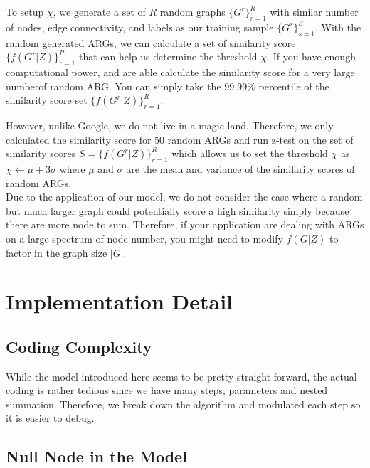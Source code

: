 To setup $\chi$, we generate a set of $R$ random graphs $\{G^r\}^{R}_{r=1}$ with similar number of nodes, edge connectivity\footnotemark, and labels as our training sample $\{G^s\}^{S}_{s=1}$. With the random generated ARGs, we can calculate a set of similarity score $\{f(G^r|Z)\}^{R}_{r=1}$ that can help us determine the threshold $\chi$. If you have enough computational power, and are able calculate the similarity score for a very large number\footnotemark of random ARG. You can simply take the $99.99\%$ percentile of the similarity score set $\{f(G^r|Z)\}^{R}_{r=1}$.\\

However, unlike Google\footnotemark, we do not live in a magic land. Therefore, we only calculated the similarity score for $50$ random ARGs and run z-test on the set of similarity scores $S=\{f(G^r|Z)\}^{R}_{r=1}$ which allows us to set the threshold $\chi$ as $\chi \leftarrow \mu+3\sigma$ where $\mu$ and $\sigma$ are the mean and variance of the similarity scores of random ARGs.
\\

Due to the application of our model, we do not consider the case where a random but much larger graph could potentially score a high similarity simply because there are more node to sum. Therefore, if your application are dealing with ARGs on a large spectrum of node number, you might need to modify $f(G|Z)$ to factor in the graph size $|G|$.

\section{Implementation Detail}

\subsection{Coding Complexity}

While the model introduced here seems to be pretty straight forward, the actual coding is rather tedious since we have many steps, parameters and nested summation. Therefore, we break down the algorithm and modulated each step so it is easier to debug.

\subsection{Null Node in the Model}

